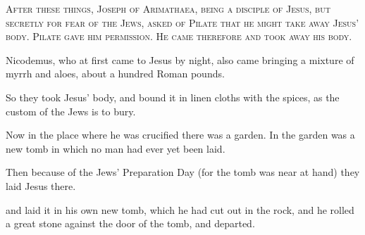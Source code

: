 \lettrine{A}{fter these things, Joseph of Arimathaea, being a disciple of Jesus, but secretly for fear of the Jews, asked of Pilate that he might take away Jesus’ body. Pilate gave him permission. He came therefore and took away his body.}

Nicodemus, who at first came to Jesus by night, also came bringing a mixture of myrrh and aloes, about a hundred Roman pounds.

So they took Jesus’ body, and bound it in linen cloths with the spices, as the custom of the Jews is to bury.

Now in the place where he was crucified there was a garden. In the garden was a new tomb in which no man had ever yet been laid.

Then because of the Jews’ Preparation Day (for the tomb was near at hand) they laid Jesus there.

and laid it in his own new tomb, which he had cut out in the rock, and he rolled a great stone against the door of the tomb, and departed.
